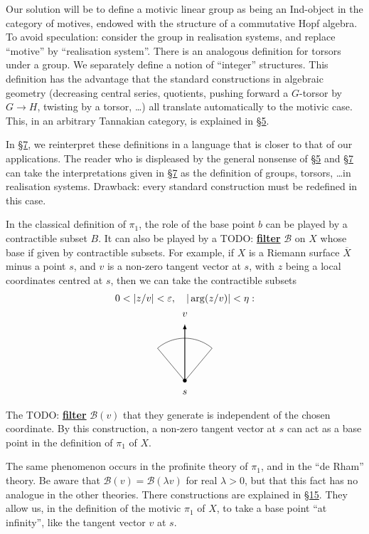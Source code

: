 \documentclass{article}
\theoremstyle{definition}
\newcommand{\unsure}[1]{TODO: \underline{\textbf{#1}}}
\newcommand{\oldpage}[1]{\marginpar{\footnotesize$\Big\vert$ \textit{p.~#1}}}
\begin{document}
Our solution will be to define a motivic linear group as being an Ind-object in the category of motives, endowed with the structure of a commutative Hopf algebra.
To avoid speculation: consider the group in realisation systems, and replace ``motive'' by ``realisation system''.
There is an analogous definition for torsors under a group.
We separately define a notion of ``integer'' structures.
This definition has the advantage that the standard constructions in algebraic geometry (decreasing central series, quotients, pushing forward a $G$-torsor by $G\to H$, twisting by a torsor, \ldots) all translate automatically to the motivic case.
This, in an arbitrary Tannakian category, is explained in \hyperref[5]{\S5}.

In \hyperref[7]{\S7}, we reinterpret these definitions in a language that is closer to that of our applications.
The reader who is displeased by the general nonsense of \hyperref[5]{\S5} and \hyperref[7]{\S7} can take the interpretations given in \hyperref[7]{\S7} as the definition of groups, torsors, \ldots in realisation systems.
Drawback: every standard construction must be redefined in this case.

In the classical definition of $\pi_1$, the role of the base point $b$ can be played by a contractible subset $B$.
It can also be played by a \unsure{filter} $\mathcal{B}$ on $X$ whose base if given by contractible subsets.
For example, if $X$ is a Riemann surface $\overline{X}$ minus a point $s$, and $v$ is a non-zero tangent vector at $s$, with $z$ being a local coordinates centred at $s$, then we can take the contractible subsets
\[
  \begin{gathered}
    0<|z/v|<\varepsilon,
    \quad
    |\arg(z/v)|<\eta:
  \\\begin{tikzpicture}
      \node[label={below:{$s$}}] at (0,0) {$\bullet$};
      \draw[thick,-latex] (0,0) to (0,2) node [label={above:{$v$}}] {};
      \draw (0,0) to (50:1.5);
      \draw (0,0) to (130:1.5);
      \draw [domain=50:130] plot ({1.5*cos(\x)}, {1.5*sin(\x)});
    \end{tikzpicture}
  \end{gathered}
\]
The \unsure{filter} $\mathcal{B}(v)$ that they generate is independent of the chosen coordinate.
By this construction, a non-zero tangent vector at $s$ can act as a base point in the definition of $\pi_1$ of $X$.

The same phenomenon occurs in the profinite theory of $\pi_1$, and in the ``de Rham'' theory.
Be aware that $\mathcal{B}(v)=\mathcal{B}(\lambda v)$ for real $\lambda>0$, but that this fact has no analogue in the other theories.
There constructions are explained in \hyperref[15]{\S15}.
They allow us,
\oldpage{8~(86)}
in the definition of the motivic $\pi_1$ of $X$, to take a base point ``at infinity'', like the tangent vector $v$ at $s$.
\end{document}
